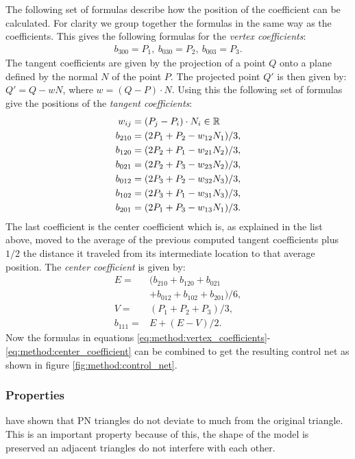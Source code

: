 %
The following set of formulas describe how the position of the coefficient can be calculated. For clarity we group together the formulas in the same way as the coefficients. This gives the following formulas for the \textit{vertex coefficients}:
\begin{align}\label{eq:method:vertex_coefficients}
	b_{300} = P_1,\ b_{030} = P_2,\ b_{003} = P_3.
\end{align}
The tangent coefficients are given by the projection of a point $Q$ onto a plane defined by the normal $N$ of the point $P$. The projected point $Q'$ is then given by: $Q' = Q - wN$, where $w = (Q - P) \cdot N$. Using this the following set of formulas give the positions of the \textit{tangent coefficients}:
\begin{align}\label{eq:method:tangent_coefficients}
	w_{ij} = {}& (P_j - P_i) \cdot N_i \in \mathbb{R} \nonumber\\
	b_{210} = {}& (2 P_1 + P_2 - w_{12}N_1) / 3,\nonumber\\
	b_{120} = {}& (2 P_2 + P_1 - w_{21}N_2) / 3,\nonumber\\
	b_{021} = {}& (2 P_2 + P_3 - w_{23}N_2) / 3, \\
	b_{012} = {}& (2 P_3 + P_2 - w_{32}N_3) / 3,\nonumber\\
	b_{102} = {}& (2 P_3 + P_1 - w_{31}N_3) / 3,\nonumber\\
	b_{201} = {}& (2 P_1 + P_3 - w_{13}N_1) / 3. \nonumber
\end{align}
The last coefficient is the center coefficient which is, as explained in the list above, moved to the average of the previous computed tangent coefficients plus $1/2$ the distance it traveled from its intermediate location to that average position.  The \textit{center coefficient} is given by:
\begin{align}\label{eq:method:center_coefficient}
	E = {}& (b_{210} + b_{120} + b_{021} \nonumber \\
		{}& + b_{012} + b_{102} + b_{201}) / 6, \nonumber\\
	V = {}& (P_1 + P_2 + P_3) / 3, \\
	b_{111} = {}& E + (E - V) / 2. \nonumber
\end{align}
Now the formulas in equations \ref{eq:method:vertex_coefficients}-\ref{eq:method:center_coefficient} can be combined to get the resulting control net as shown in figure \ref{fig:method:control_net}.
\subsubsection{Properties}
\citeauthor{vlachos2001curved} have shown that PN triangles do not deviate to much from the original triangle. This is an important property because of this, the shape of the model is preserved an adjacent triangles do not interfere with each other. 

